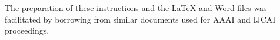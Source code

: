 \documentclass[letterpaper]{article}
\begin{document}
The preparation of these instructions and the \LaTeX{} and Word files was 
facilitated by borrowing from similar documents used for AAAI and IJCAI proceedings.










\end{document}
